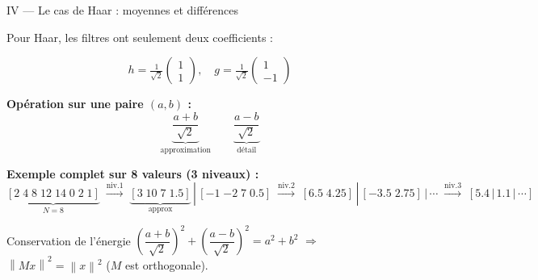 \documentclass[10pt]{beamer}
\newcommand{\norme}[1]{\left\| #1 \right\|}
\begin{document}
	\begin{frame}{IV — Le cas de Haar : moyennes et différences}
		
		Pour Haar, les filtres ont seulement deux coefficients :
		
		\[
		h = \tfrac{1}{\sqrt{2}}\begin{pmatrix}1\\1\end{pmatrix}, \quad
		g = \tfrac{1}{\sqrt{2}}\begin{pmatrix}1\\-1\end{pmatrix}
		\]
		
		\medskip
		\textbf{Opération sur une paire $(a, b)$ :}
		\[
		\underbrace{\frac{a+b}{\sqrt{2}}}_{\text{approximation}} \qquad
		\underbrace{\frac{a-b}{\sqrt{2}}}_{\text{détail}}
		\]
		
		\medskip
		\textbf{Exemple complet sur 8 valeurs (3 niveaux) :}
		\[
		\underbrace{[2\;4\;8\;12\;14\;0\;2\;1]}_{N=8}
		\;\xrightarrow{\text{niv.1}}\;
		\underbrace{[3\;10\;7\;1.5]}_{\text{approx}} \,|\, [-1\;{-2}\;7\;0.5]
		\;\xrightarrow{\text{niv.2}}\;
		[6.5\;4.25]\,|\,[-3.5\;2.75]\,|\,\cdots
		\;\xrightarrow{\text{niv.3}}\;
		[5.4\,|\,1.1\,|\,\cdots]
		\]
		
		\medskip
		\begin{block}{Conservation de l'énergie}
			$\left(\dfrac{a+b}{\sqrt{2}}\right)^2 + \left(\dfrac{a-b}{\sqrt{2}}\right)^2
			= a^2 + b^2$
			\quad $\Rightarrow$ $\norme{Mx}^2 = \norme{x}^2$
			\quad ($M$ est orthogonale).
		\end{block}
		
	\end{frame}
	
\end{document}
